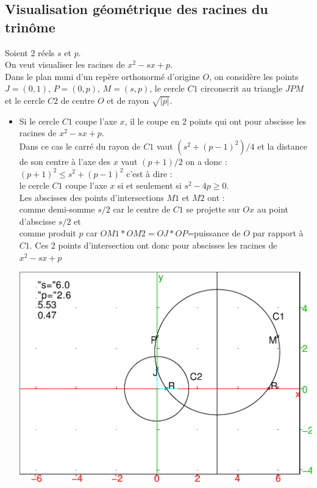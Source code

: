 \documentclass[a4paper,11pt]{book}
\begin{document}
\subsection{Visualisation g\'eom\'etrique des racines du trin\^ome}
Soient 2 r\'eels $s$ et $p$.\\
On veut visualiser les racines de $x^2-sx+p$.\\
Dans le plan muni d'un rep\`ere orthonorm\'e d'origine $O$, on consid\`ere les 
points $J=(0,1)$, $P=(0,p)$, $M=(s,p )$, le cercle $C1$ circonscrit au triangle 
$JPM$ et le cercle $C2$ de centre $O$ et de rayon $\sqrt{|p|}$.\\
\begin{itemize}
\item Si le cercle $C1$ coupe l'axe $x$, il le coupe en 2 points qui ont pour 
abscisse les racines de $x^2-sx+p$.\\  
Dans ce cas le carr\'e du rayon de $C1$ vaut $(s^2+(p-1)^2)/4$ et 
la distance de son centre \`a l'axe des $x$ vaut $(p+1)/2$ on a donc :
$(p+1)^2\leq s^2+(p-1)^2$ c'est \`a dire :\\
le cercle $C1$ coupe l'axe $x$ si et seulement si $s^2-4p\geq 0$.\\
Les abscisses des points d'intersections $M1$ et $M2$ ont :\\
comme demi-somme $s/2$ car le centre de $C1$ se projette sur $Ox$ au point 
d'abscisse $s/2$ et\\
comme produit $p$ car $OM1*OM2=OJ*OP$=puissance de $O$ par rapport \`a $C1$.
Ces 2 points d'intersection ont donc pour abscisses les racines de $x^2-sx+p$
\begin{center}\includegraphics[width=\textwidth]{visutri}\end{center}

\end{itemize}
\end{document}
